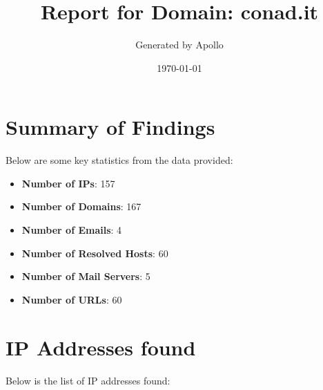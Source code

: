 \documentclass{article}
\title{Report for Domain: conad.it}
\author{Generated by Apollo}
\date{\today}
\begin{document}
\maketitle

\section*{Summary of Findings}

Below are some key statistics from the data provided:

\begin{itemize}
    \item \textbf{Number of IPs}: 157
    \item \textbf{Number of Domains}: 167
    \item \textbf{Number of Emails}: 4
    \item \textbf{Number of Resolved Hosts}: 60
    \item \textbf{Number of Mail Servers}: 5
    \item \textbf{Number of URLs}: 60
\end{itemize}

\section*{IP Addresses found}

Below is the list of IP addresses found:
\end{document}
